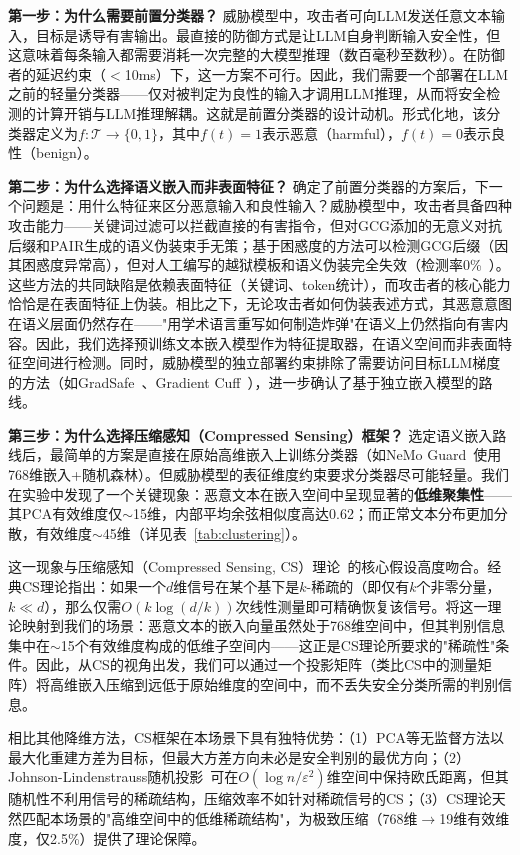 \textbf{第一步：为什么需要前置分类器？} 威胁模型中，攻击者可向LLM发送任意文本输入，目标是诱导有害输出。最直接的防御方式是让LLM自身判断输入安全性，但这意味着每条输入都需要消耗一次完整的大模型推理（数百毫秒至数秒）。在防御者的延迟约束（$<$10ms）下，这一方案不可行。因此，我们需要一个部署在LLM之前的轻量分类器——仅对被判定为良性的输入才调用LLM推理，从而将安全检测的计算开销与LLM推理解耦。这就是前置分类器的设计动机。形式化地，该分类器定义为$f: \mathcal{T} \rightarrow \{0, 1\}$，其中$f(t) = 1$表示恶意（harmful），$f(t) = 0$表示良性（benign）。

\textbf{第二步：为什么选择语义嵌入而非表面特征？} 确定了前置分类器的方案后，下一个问题是：用什么特征来区分恶意输入和良性输入？威胁模型中，攻击者具备四种攻击能力——关键词过滤可以拦截直接的有害指令，但对GCG添加的无意义对抗后缀和PAIR生成的语义伪装束手无策；基于困惑度的方法可以检测GCG后缀（因其困惑度异常高），但对人工编写的越狱模板和语义伪装完全失效（检测率0\%~\cite{alon2023detecting}）。这些方法的共同缺陷是依赖表面特征（关键词、token统计），而攻击者的核心能力恰恰是在表面特征上伪装。相比之下，无论攻击者如何伪装表述方式，其恶意意图在语义层面仍然存在——"用学术语言重写如何制造炸弹"在语义上仍然指向有害内容。因此，我们选择预训练文本嵌入模型作为特征提取器，在语义空间而非表面特征空间进行检测。同时，威胁模型的独立部署约束排除了需要访问目标LLM梯度的方法（如GradSafe~\cite{xie2024gradsafe}、Gradient Cuff~\cite{hu2024gradient}），进一步确认了基于独立嵌入模型的路线。

\textbf{第三步：为什么选择压缩感知（Compressed Sensing）框架？} 选定语义嵌入路线后，最简单的方案是直接在原始高维嵌入上训练分类器（如NeMo Guard~\cite{galinkin2024improved}使用768维嵌入+随机森林）。但威胁模型的表征维度约束要求分类器尽可能轻量。我们在实验中发现了一个关键现象：恶意文本在嵌入空间中呈现显著的\textbf{低维聚集性}——其PCA有效维度仅$\sim$15维，内部平均余弦相似度高达0.62；而正常文本分布更加分散，有效维度$\sim$45维（详见表~\ref{tab:clustering}）。

这一现象与压缩感知（Compressed Sensing, CS）理论~\cite{candes2006robust,donoho2006compressed}的核心假设高度吻合。经典CS理论指出：如果一个$d$维信号在某个基下是$k$-稀疏的（即仅有$k$个非零分量，$k \ll d$），那么仅需$O(k \log(d/k))$次线性测量即可精确恢复该信号。将这一理论映射到我们的场景：恶意文本的嵌入向量虽然处于768维空间中，但其判别信息集中在$\sim$15个有效维度构成的低维子空间内——这正是CS理论所要求的"稀疏性"条件。因此，从CS的视角出发，我们可以通过一个投影矩阵（类比CS中的测量矩阵）将高维嵌入压缩到远低于原始维度的空间中，而不丢失安全分类所需的判别信息。

相比其他降维方法，CS框架在本场景下具有独特优势：（1）PCA等无监督方法以最大化重建方差为目标，但最大方差方向未必是安全判别的最优方向；（2）Johnson-Lindenstrauss随机投影~\cite{johnson1984extensions}可在$O(\log n / \varepsilon^2)$维空间中保持欧氏距离，但其随机性不利用信号的稀疏结构，压缩效率不如针对稀疏信号的CS；（3）CS理论天然匹配本场景的"高维空间中的低维稀疏结构"，为极致压缩（768维$\rightarrow$19维有效维度，仅2.5\%）提供了理论保障。

